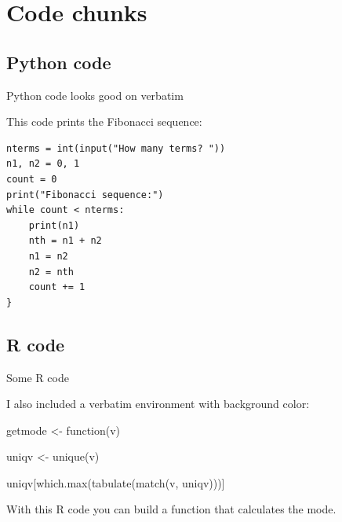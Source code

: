 \section{Code chunks}

\subsection{Python code}


\begin{frame}[fragile]{Python code looks good on verbatim}

This code prints the Fibonacci sequence:

\begin{verbatim}
nterms = int(input("How many terms? "))
n1, n2 = 0, 1
count = 0
print("Fibonacci sequence:")
while count < nterms:
    print(n1)
    nth = n1 + n2
    n1 = n2
    n2 = nth
    count += 1
}
\end{verbatim}

\end{frame}

\subsection{R code}


\begin{frame}[fragile]{Some R code}

I also included a verbatim environment with background color:

\begin{cverbatim}
getmode <- function(v) {
  
  uniqv <- unique(v)
  
  uniqv[which.max(tabulate(match(v, uniqv)))]
  
}
\end{cverbatim}

With this R code you can build a function that calculates the mode.

\end{frame}



















